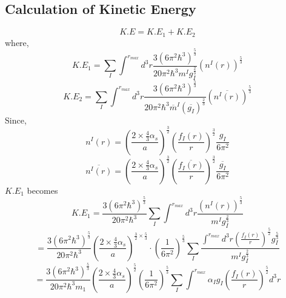 \documentclass[fleqn, 10pt]{article}
\begin{document}
\subsection{ Calculation of Kinetic Energy }
\begin{equation}
  K.E= K.E_{1} + K.E_{2} 
\label{K1}
\end{equation}
where, 
\begin{equation*}
    K.E_{1} = \sum_{I}\int^{r_{max}} d^{3}r \frac{3(6\pi^{2}\hbar^{3})^\frac{5}{3}}{20\pi^{2}\hbar^{3}m^{I}g_{I}^\frac{2}{3}} (n^{I}(r))^\frac{5}{3}
\end{equation*}
\begin{equation*}
    K.E_{2} = \sum_{I} \int^{r_{max}}d^{3}r \frac{3(6\pi^{2}\hbar^{3})^\frac{5}{3}}{20\pi^{2}\hbar^{3}\overline{m}^{I} (\overline{g_{I}})^\frac{2}{3}} (\overline{n^{I}(r)})^\frac{5}{3}
\end{equation*}
Since, 
\begin{equation}
    n^{I}(r) = \left( \frac{2\times\frac{4}{3}\alpha_{s}}{a}\right)^\frac{3}{2} \left( \frac{f_{I}(r)}{r}\right)^\frac{3}{2} \frac{g_{I}}{6\pi^{2}}
        \label{K2}
\end{equation}
\begin{equation*}
    \overline{n^{I}(r)} = \left( \frac{2\times\frac{4}{3}\alpha_{s}}{a}\right)^\frac{3}{2} \left( \frac{\overline{f_{I}(r)}}{r}\right)^\frac{3}{2} \frac{\overline{g_{I}}}{6\pi^{2}}
\end{equation*}
$K.E_{1}$ becomes
\begin{equation*}
    K.E_{1}= \frac{3(6\pi^{2}\hbar^{3})^\frac{5}{3}}{20 \pi^{2}\hbar^{3}} \sum_{I} \int^{r_{max}}d^{3}r \frac{(n^{I}(r))^\frac{5}{3}}{m^{I}g_{I}^\frac{2}{3}}
\end{equation*}
\begin{equation*}
    = \frac{3(6\pi^{2}\hbar^{3})^\frac{5}{3}}{20 \pi^{2} \hbar^{3}} \left( \frac{2 \times \frac{4}{3} \alpha_{s}}{a}\right)^{ \frac{3}{2} \times \frac{5}{3} }\cdot\left( \frac{1}{6 \pi^{2}}\right)^\frac{5}{3} \sum_{I} \frac{\int^{r_{max}}d^{3}r \left( \frac{f_{I}(r)}{r}\right)^\frac{5}{2}g_{I}^\frac{5}{3}}{m^{I}g_{I}^\frac{2}{3}}
\end{equation*}
\begin{equation*}
    = \frac{3(6\pi^{2}\hbar^{3})^\frac{5}{3}}{20 \pi^{2}\hbar^{3}m_{1}} \left( \frac{2 \times \frac{4}{3} \alpha_{s}}{a}\right)^\frac{5}{2} \left( \frac{1}{6\pi^{2}}\right)^\frac{5}{3} \sum_{I}\int^{r_{max}} \alpha_{I} g_{I} \left( \frac{f_{I}(r)}{r}\right)^\frac{5}{2} d^{3}r 
\end{equation*}
\end{document}
